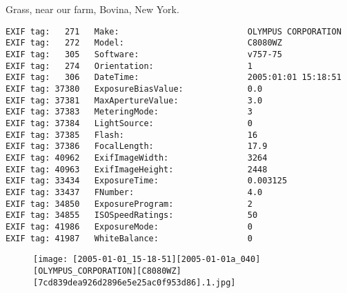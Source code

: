 \section{\protect{}}
\noindent Grass, near our farm, Bovina, New York.
\noindent
\begin{lstlisting}
EXIF tag:   271   Make:                          OLYMPUS CORPORATION
EXIF tag:   272   Model:                         C8080WZ
EXIF tag:   305   Software:                      v757-75
EXIF tag:   274   Orientation:                   1
EXIF tag:   306   DateTime:                      2005:01:01 15:18:51
EXIF tag: 37380   ExposureBiasValue:             0.0
EXIF tag: 37381   MaxApertureValue:              3.0
EXIF tag: 37383   MeteringMode:                  3
EXIF tag: 37384   LightSource:                   0
EXIF tag: 37385   Flash:                         16
EXIF tag: 37386   FocalLength:                   17.9
EXIF tag: 40962   ExifImageWidth:                3264
EXIF tag: 40963   ExifImageHeight:               2448
EXIF tag: 33434   ExposureTime:                  0.003125
EXIF tag: 33437   FNumber:                       4.0
EXIF tag: 34850   ExposureProgram:               2
EXIF tag: 34855   ISOSpeedRatings:               50
EXIF tag: 41986   ExposureMode:                  0
EXIF tag: 41987   WhiteBalance:                  0

\end{lstlisting}
\clearpage
\begin{figure}
\raggedleft
\texttt{[image: [2005-01-01\_15-18-51][2005-01-01a\_040][OLYMPUS\_CORPORATION][C8080WZ][7cd839dea926d2896e5e25ac0f953d86].1.jpg]}
\end{figure}


\clearpage
